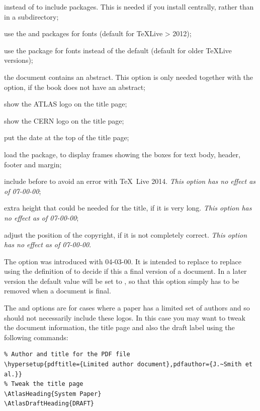 \begin{description}
  instead of  to include packages.
  This is needed if you install  centrally,
  rather than in a  subdirectory;
\item[\Option{newtx}] use the  and  packages for fonts 
  (default for \TeX Live > 2012);
\item[\Option{txfonts}] use the  package for fonts instead of the default
  (default for older \TeX Live versions);
\item[\Option{abstract=true|\normalfont{false}}] the document contains an abstract.
  This option is only needed together with the  option,
  if the book does not have an abstract;
\item[\Option{atlaslogo=true|{\normalfont false}}] show the ATLAS logo on the title page;
\item[\Option{cernlogo=true|{\normalfont false}}] show the CERN logo on the title page;
\item[\Option{datetop=true|{\normalfont false}}] put the date at the top of the title page;
\item[\Option{showframe={\normalfont true}|false}] load the  package, to display frames showing the boxes for text body, header, footer and margin;
\item[\Option{mhchem={\normalfont true}|false}] include  before  to avoid
  an error with \TeX\ Live 2014.
  \emph{This option has no effect as of  07-00-00};
\item[\Option{titleextraheight=0em}] extra height that could be needed for the title, if it is very long.
  \emph{This option has no effect as of  07-00-00};
\item[\Option{copyrightoffset=0em}] adjust the position of the copyright, if it is not completely correct.
  \emph{This option has no effect as of  07-00-00}.
\end{description}

The option  was introduced with  04-03-00.
It is intended to replace to replace using the definition of  to decide if this a final version of a document.
In a later version the default value will be set to ,
so that this option simply has to be removed when a document is final.

The  and  options are for cases where a paper has a limited set of authors
and so should not necessarily include these logos.
In this case you may want to tweak the  document information,
the title page and also the draft label using the following commands:
\begin{verbatim}
% Author and title for the PDF file
\hypersetup{pdftitle={Limited author document},pdfauthor={J.~Smith et al.}}
% Tweak the title page
\AtlasHeading{System Paper}
\AtlasDraftHeading{DRAFT}
\end{verbatim}

